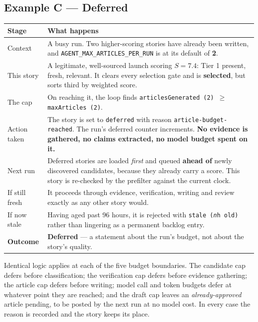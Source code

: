 \documentclass[11pt,a4paper]{article}
\newcommand{\var}[1]{\texttt{\small\hyphenpenalty=0\exhyphenpenalty=0\relax #1}}
\newcommand{\us}{\_\discretionary{}{}{}}
\newcommand{\brk}{\hyphenpenalty=0\exhyphenpenalty=0\relax}
\newcommand{\code}[1]{\texttt{\small\brk #1}}
\begin{document}
\subsection{Example C --- Deferred}

\begin{center}
\small
\begin{tabularx}{\textwidth}{@{}p{3.9cm} >{\RaggedRight}X@{}}
\toprule
\textbf{Stage} & \textbf{What happens} \\
\midrule
Context & A busy run. Two higher-scoring stories have already been written, and
  \var{AGENT\us MAX\us ARTICLES\us PER\us RUN} is at its default of \textbf{2}. \\
This story & A legitimate, well-sourced launch scoring $S = 7.4$: Tier 1 present,
  fresh, relevant. It clears every selection gate and is
  \textcolor{aitkGo}{\textbf{selected}}, but sorts third by weighted score. \\
The cap & On reaching it, the loop finds
  \code{articlesGenerated (2) $\geq$ maxArticles (2)}. \\
Action taken & The story is set to \code{deferred} with reason
  \code{article-budget-reached}. The run's deferred counter increments. \textbf{No
  evidence is gathered, no claims extracted, no model budget spent on it.} \\
Next run & Deferred stories are loaded \emph{first} and queued \textbf{ahead of}
  newly discovered candidates, because they already carry a score. This story is
  re-checked by the prefilter against the current clock. \\
If still fresh & It proceeds through evidence, verification, writing and review
  exactly as any other story would. \\
If now stale & Having aged past 96 hours, it is \textcolor{aitkStop}{rejected} with
  \code{stale (\textit{n}h old)} rather than lingering as a permanent backlog
  entry. \\
\midrule
\textbf{Outcome} & \textcolor{aitkHold}{\textbf{Deferred}} --- a statement about the
  run's budget, not about the story's quality. \\
\bottomrule
\end{tabularx}
\end{center}

\begin{infobox}
Identical logic applies at each of the five budget boundaries. The candidate cap
defers before classification; the verification cap defers before evidence
gathering; the article cap defers before writing; model call and token budgets
defer at whatever point they are reached; and the draft cap leaves an
\emph{already-approved} article pending, to be posted by the next run at no model
cost. In every case the reason is recorded and the story keeps its place.
\end{infobox}
\end{document}
